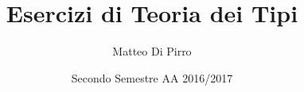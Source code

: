 \author{Matteo Di Pirro}

\title{Esercizi di Teoria dei Tipi}
\date{Secondo Semestre AA 2016/2017}
\maketitle

\newpage
\tableofcontents
